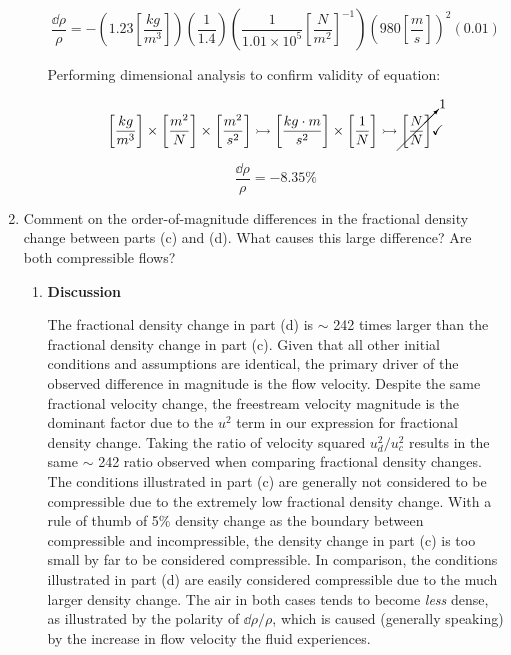 \documentclass[12pt,letterpaper]{article}
\begin{document}
\begin{enumerate}[label=(\alph*)]
\begin{enumerate}[label=\arabic*.]
			\begin{equation*}
				\frac{\dd \rho}{\rho} = - \left(1.23\left[\frac{kg}{m^3}\right]\right) \left(\frac{1}{1.4}\right)\left(\frac{1}{1.01 \times 10^5}\left[\frac{N}{m^2}\right]^{-1} \right) \left(980 \left[\frac{m}{s}\right]\right)^2 \left(0.01\right)
			\end{equation*}
			
			Performing dimensional analysis to confirm validity of equation:
			
			\begin{equation*}
				\left[\frac{kg}{m^3}\right] \times \left[\frac{m^2}{N}\right] \times \left[\frac{m^2}{s^2}\right] \rightarrowtail \left[\frac{kg \cdot m}{s^2}\right] \times \left[\frac{1}{N}\right] \rightarrowtail \cancelto{1}{\left[\frac{N}{N}\right]} \checkmark
			\end{equation*}
			
			\begin{equation*}
				\boxed{\frac{\dd \rho}{\rho} = -8.35\%}
			\end{equation*}
		\end{enumerate}	
	
		\item Comment on the order-of-magnitude differences in the fractional density change between parts (c) and (d). What causes this large difference? Are both compressible flows?
		
		\begin{enumerate}[label=\arabic*.]
			
			\item{\textbf{Discussion}} \\
			The fractional density change in part (d) is $\sim$ 242 times larger than the fractional density change in part (c). Given that all other initial conditions and assumptions are identical, the primary driver of the observed difference in magnitude is the flow velocity. Despite the same fractional velocity change, the freestream velocity magnitude is the dominant factor due to the $u^2$ term in our expression for fractional density change. Taking the ratio of velocity squared $u_{d}^2/u_{c}^2$ results in the same $\sim$ 242 ratio observed when comparing fractional density changes. \\The conditions illustrated in part (c) are generally not considered to be compressible due to the extremely low fractional density change. With a rule of thumb of 5\% density change as the boundary between compressible and incompressible, the density change in part (c) is too small by far to be considered compressible. In comparison, the conditions illustrated in part (d) are easily considered compressible due to the much larger density change. The air in both cases tends to become \textit{less} dense, as illustrated by the polarity of $\dd \rho/\rho$, which is caused (generally speaking) by the increase in flow velocity the fluid experiences. 
		\end{enumerate}
	

\end{enumerate}
\end{document}
